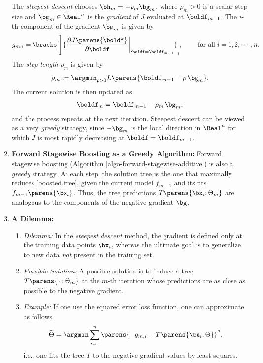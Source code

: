 \documentclass[12pt]{article}
\begin{document}
\begin{enumerate}[label=\textbf{\arabic*.}]
	The \textit{steepest descent} chooses $\bh_m = - \rho_m \bg_m$, where $\rho_m > 0$ is a scalar step size and $\bg_m \in \Real^n$ is the \textit{gradient} of $J$ evaluated at $\boldf_{m-1}$. The $i$-th component of the gradient $\bg_m$ is given by 
	\begin{align*}
		g_{m, i} = \bracks[\Bigg]{\left. \frac{\partial J \parens{\boldf}}{\partial \boldf} \right\vert_{\boldf = \boldf_{m-1}}}_{i}, \qquad \text{ for all } i = 1, 2, \cdots, n. 
	\end{align*}
	The \textit{step length} $\rho_m$ is given by 
	\begin{align*}
		\rho_m := \argmin_{\rho > 0} L \parens{\boldf_{m-1} - \rho \, \bg_m}. 
	\end{align*}
	The current solution is then updated as 
	\begin{align*}
		\boldf_m = \boldf_{m-1} - \rho_m \, \bg_m, 
	\end{align*}
	and the process repeats at the next iteration. Steepest descent can be viewed as a very \textit{greedy} strategy, since $-\bg_m$ is the local direction in $\Real^n$ for which $J$ is most rapidly decreasing at $\boldf = \boldf_{m-1}$.  
	
	\item \textbf{Forward Stagewise Boosting as a Greedy Algorithm:} Forward stagewise boosting (Algorithm \ref{algo-forward-stagewise-additive}) is also a \textit{greedy} strategy. At each step, the solution tree is the one that maximally reduces \eqref{boosted.tree}, given the current model $f_{m-1}$ and its fits $f_{m-1} \parens{\bx_i}$. Thus, the tree predictions $T \parens{\bx_i; \Theta_m}$ are analogous to the components of the negative gradient $\bg$. 

	
	\item \textbf{A Dilemma:} 
	\begin{enumerate}
		\item \textit{Dilemma:} In the \textit{steepest descent} method, the gradient is defined only at the training data points $\bx_i$, whereas the ultimate goal is to generalize to new data \emph{not} present in the training set. 
		\item \textit{Possible Solution:} A possible solution is to induce a tree $T \parens{\,\cdot\,; \Theta_m}$ at the $m$-th iteration whose predictions are as close as possible to the negative gradient. 
		\item \textit{Example:} If one use the squared error loss function, one can approximate as follows 
		\begin{align*}
			\widetilde{\Theta} = \argmin \sum_{i=1}^n \parens{-g_{m,i} - T \parens{\bx_i; \Theta}}^2, 
		\end{align*}
		i.e., one fits the tree $T$ to the negative gradient values by least squares. 
	\end{enumerate}
	

\end{enumerate}
\end{document}
